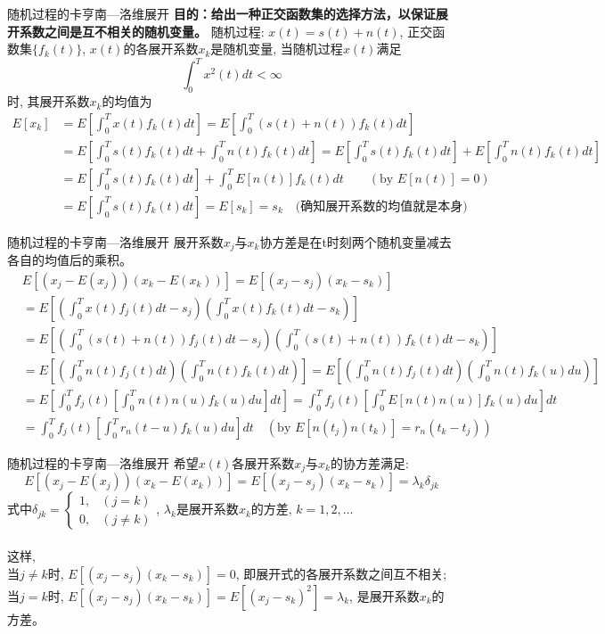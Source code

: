 \begin{frame}[shrink]{随机过程的卡亨南---洛维展开}
\textbf{目的：给出一种正交函数集的选择方法，以保证展开系数之间是互不相关的随机变量。}
随机过程: $x(t)=s(t)+n(t)$, 正交函数集$\{f_k(t)\}$, $x(t)$的各展开系数$x_k$是随机变量, 当随机过程$x(t)$满足
\[\int_{0}^{T}x^2(t)dt<\infty \]
时, 其展开系数$x_k$的均值为
\begin{align*}
E[x_k]&=E\left[\int_{0}^{T}x(t)f_k(t)dt\right]=E\left[\int_{0}^{T}\left(s(t)+n(t)\right)f_k(t)dt\right]\\
&=E\left[\int_{0}^{T}s(t)f_k(t)dt+\int_{0}^{T}n(t)f_k(t)dt\right]=E\left[\int_{0}^{T}s(t)f_k(t)dt\right]+E\left[\int_{0}^{T}n(t)f_k(t)dt\right]\\
&=E\left[\int_{0}^{T}s(t)f_k(t)dt\right]+\int_{0}^{T}E[n(t)]f_k(t)dt \qquad  (\text{by }E[n(t)]=0)\\
&=E\left[\int_{0}^{T}s(t)f_k(t)dt\right]=E[s_k] = s_k\quad \text{(确知展开系数的均值就是本身)}
\end{align*}
\end{frame}

\begin{frame}{随机过程的卡亨南---洛维展开}
展开系数$x_j$与$x_k$协方差是在t时刻两个随机变量减去各自的均值后的乘积。
\begin{align*}
&E[(x_j-E(x_j))(x_k-E(x_k))]=E[(x_j-s_j)(x_k-s_k)]\\
&=E\left[\left(\int_{0}^{T}x(t)f_j(t)dt-s_j\right)\left(\int_{0}^{T}x(t)f_k(t)dt-s_k\right)\right]\\
&=E\left[\left(\int_{0}^{T}(s(t)+n(t))f_j(t)dt-s_j\right)\left(\int_{0}^{T}(s(t)+n(t))f_k(t)dt-s_k\right)\right]\\
&=E\left[\left(\int_{0}^{T}n(t)f_j(t)dt\right)\left(\int_{0}^{T}n(t)f_k(t)dt\right)\right]=E\left[\left(\int_{0}^{T}n(t)f_j(t)dt\right)\left(\int_{0}^{T}n(t)f_k(u)du\right)\right]\\
&=E\left[\int_{0}^{T}f_j(t)\left[\int_{0}^{T}n(t)n(u)f_k(u)du\right]dt\right]=\int_{0}^{T}f_j(t)\left[\int_{0}^{T}E[n(t)n(u)]f_k(u)du\right]dt\\
&=\int_{0}^{T}f_j(t)\left[\int_{0}^{T}r_n(t-u)f_k(u)du\right]dt\quad (\text{by }E[n(t_j)n(t_k)]=r_n(t_k-t_j))
\end{align*}
\end{frame}

\begin{frame}{随机过程的卡亨南---洛维展开}
希望$x(t)$各展开系数$x_j$与$x_k$的协方差满足:
\[E[(x_j-E(x_j))(x_k-E(x_k))]=E[(x_j-s_j)(x_k-s_k)]=\lambda_k\delta_{jk} \]
式中$\delta_{jk}=
\begin{cases}
1, & (j=k)\\
0, & (j\ne k)
\end{cases}$, \quad $\lambda_k$是展开系数$x_k$的方差, $k=1,2,\dots$\\
~\\
这样,\\
当$j\ne k$时, $E[(x_j-s_j)(x_k-s_k)]=0$, 即展开式的各展开系数之间互不相关;\\ 当$j=k$时, $E[(x_j-s_j)(x_k-s_k)]=E[(x_j-s_k)^2]=\lambda_k$, 是展开系数$x_k$的方差。
\end{frame}

